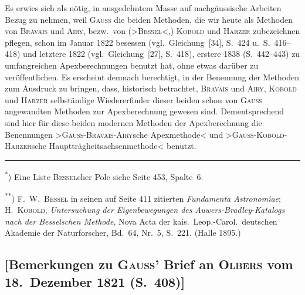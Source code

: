 \documentclass[12pt,a4paper]{article}
\theoremstyle{plain}
\theoremstyle{definition}
\theoremstyle{remark}
\begin{document}
\begin{small}
Es erwies sich als n\"otig, in ausgedehntem Masse auf nachg\"aussische Arbeiten
Bezug zu nehmen, weil \textsc{Gauss} die beiden Methoden, die wir heute als Methoden
von \textsc{Bravais} und \textsc{Airy}, bezw.~von (\textgreater{}\textsc{Bessel}\textless{},) \textsc{Kobold} und
\textsc{Harzer} zubezeichnen pflegen, schon im Januar 1822 besessen (vgl.~Gleichung~[34],
S.~424 u.~S.~416--418) und letztere 1822 (vgl.~Gleichung~[27], S.~418), erstere
1838 (S.~442--443) zu umfangreichen Apexberechnungen benutzt hat, ohne etwas
dar\"uber zu ver\"offentlichen. Es erscheint demnach berechtigt, in der Benennung
der Methoden zum Ausdruck zu bringen, dass, historisch betrachtet, \textsc{Bravais}
und \textsc{Airy}, \textsc{Kobold} und \textsc{Harzer} selbst\"andige Wiedererfinder dieser beiden
schon von \textsc{Gauss} angewandten Methoden zur Apexberechnung gewesen sind.
Dementsprechend sind hier f\"ur diese beiden modernen Methoden der Apexberechnung
die Benennungen \textgreater{}\textsc{Gauss-Bravais-Airy}sche Apexmethode\textless{} und
\textgreater{}\textsc{Gauss-Kobold-Harzer}sche Haupttr\"agheitsachsenmethode\textless{} benutzt.
\end{small}

\medskip
\noindent\rule{\textwidth}{0.4pt}
\begin{footnotesize}
\textsuperscript{*}) Eine Liste \textsc{Bessel}cher Pole siehe Seite 453, Spalte~6.

\textsuperscript{**}) F.~W.~\textsc{Bessel} in seinen auf Seite 411 zitierten \textit{Fundamenta Astronomiae};
\textsc{H.~Kobold}, \textit{Untersuchung der Eigenbewegungen des Auwers-Bradley-Katalogs
nach der Besselschen Methode}, Nova Acta der kais.~Leop.-Carol.~deutschen Akademie
der Naturforscher, Bd.~64, Nr.~5, S.~221. (Halle 1895.)
\end{footnotesize}

\newpage
\subsection*{[Bemerkungen zu \textsc{Gauss'} Brief an \textsc{Olbers} vom 18.~Dezember 1821 (S.~408)]}
\end{document}
